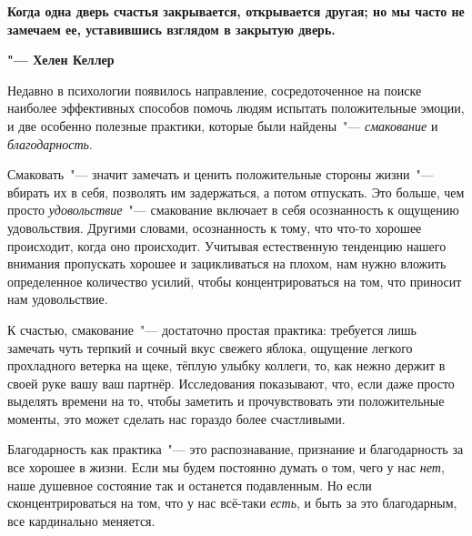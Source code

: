 \begin{center}
	\textbf{
		Когда одна дверь счастья закрывается, открывается другая; но мы часто не замечаем ее, уставившись взглядом в закрытую дверь.
	}
	
	\textbf{"--- Хелен Келлер}
\end{center}


Недавно в психологии появилось направление, сосредоточенное на поиске наиболее эффективных способов помочь людям испытать положительные эмоции, и две особенно полезные практики, которые были найдены~"--- \emph{смакование} и \emph{благодарность}.

\vspace{3ex}


\vspace{1ex}

Смаковать~"--- значит замечать и ценить положительные стороны жизни~"--- вбирать их в себя, позволять им задержаться, а потом отпускать. Это больше, чем просто \emph{удовольствие}~"--- смакование включает в себя осознанность к ощущению удовольствия. Другими словами, осознанность к тому, что что-то хорошее происходит, когда оно происходит. Учитывая естественную тенденцию нашего внимания пропускать хорошее и зацикливаться на плохом, нам нужно вложить определенное количество усилий, чтобы концентрироваться на том, что приносит нам удовольствие.

К счастью, смакование~"--- достаточно простая практика: требуется лишь замечать чуть терпкий и сочный вкус свежего яблока, ощущение легкого прохладного ветерка на щеке, тёплую улыбку коллеги, то, как нежно держит в своей руке вашу ваш партнёр. Исследования показывают, что, если даже просто выделять времени на то, чтобы заметить и прочувствовать эти положительные моменты, это может сделать нас гораздо более счастливыми.


\vspace{3ex}


\vspace{1ex}

Благодарность как практика~"--- это распознавание, признание и благодарность за все хорошее в жизни. Если мы будем постоянно думать о том, чего у нас \emph{нет}, наше душевное состояние так и останется подавленным. Но если сконцентрироваться на том, что у нас всё-таки \emph{есть}, и быть за это благодарным, все кардинально меняется.

